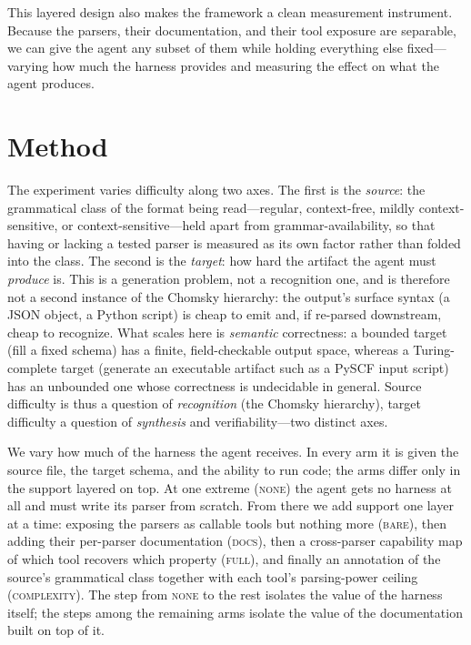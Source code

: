 \documentclass{article}
\newif\ifshowtheme\showthemefalse
\newcommand{\theme}[1]{\ifshowtheme{\normalfont\sffamily\footnotesize\color{gray}[\,#1\,]\ }\fi}
\begin{document}
This layered design also makes the framework a clean measurement instrument. Because the
parsers, their documentation, and their tool exposure are separable, we can give the agent
any subset of them while holding everything else fixed---varying how much the harness
provides and measuring the effect on what the agent produces.

\section{Method}

\theme{two axes}The experiment varies difficulty along two axes. The first is
the \emph{source}: the grammatical class of the format being read---regular,
context-free, mildly context-sensitive, or context-sensitive---held apart from
grammar-availability, so that having or lacking a tested parser is measured as its own
factor rather than folded into the class. The second is the \emph{target}: how hard the artifact
the agent must \emph{produce} is. This is a generation problem, not a recognition one,
and is therefore not a second instance of the Chomsky hierarchy: the output's
surface syntax (a JSON object, a Python script) is cheap to emit and, if re-parsed
downstream, cheap to recognize. What scales here is \emph{semantic} correctness: a
bounded target (fill a fixed schema) has a finite, field-checkable output space,
whereas a Turing-complete target (generate an executable artifact such as a PySCF input
script) has an unbounded one whose correctness is undecidable in general. Source
difficulty is thus a question of \emph{recognition} (the Chomsky hierarchy), target
difficulty a question of \emph{synthesis} and verifiability---two distinct axes.

\theme{arms}We vary how much of the harness the agent receives. In every arm
it is given the source file, the target schema, and the ability to run code; the arms
differ only in the support layered on top. At one extreme (\textsc{none}) the agent
gets no harness at all and must write its parser from scratch. From there we add
support one layer at a time: exposing the parsers as callable tools but nothing more
(\textsc{bare}), then adding their per-parser documentation (\textsc{docs}), then a
cross-parser capability map of which tool recovers which property (\textsc{full}), and
finally an annotation of the source's grammatical class together with each tool's
parsing-power ceiling (\textsc{complexity}). The step from \textsc{none} to the rest
isolates the value of the harness itself; the steps among the remaining arms isolate
the value of the documentation built on top of it.
\end{document}
